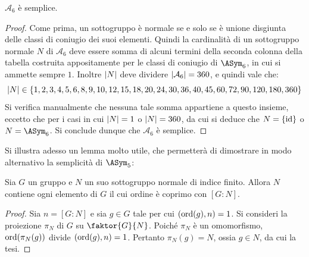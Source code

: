 \documentclass[11pt]{scrartcl}
\begin{document}
	\begin{proposition}
		\label{prop:a_6}
		$\mathcal{A}_6$ è semplice.
	\end{proposition}
	
	\begin{proof}
		Come prima, un sottogruppo è normale se e solo se è unione disgiunta
		delle classi di coniugio dei suoi elementi. Quindi la cardinalità
		di un sottogruppo normale $N$ di $\mathcal{A}_6$ deve essere somma di alcuni 
		termini della seconda colonna della tabella costruita appositamente
		per le classi di coniugio di $\ASym_6$,
		in cui si ammette sempre $1$. Inoltre $\left\lvert N \right\rvert$ deve dividere
		$\left\lvert \mathcal{A}_6 \right\rvert = 360$, e quindi vale che:
		\[ \left\lvert N \right\rvert \in \{1, 2, 3, 4, 5, 6, 8, 9, 10, 12, 15, 18, 20, 24, 30, 36, 40, 45, 60, 72, 90, 120, 180, 360\} \]
		Si verifica manualmente che nessuna tale somma appartiene a questo insieme,
		eccetto che per i casi in cui $\left\lvert N \right\rvert = 1$ o $\left\lvert N \right\rvert = 360$, da cui
		si deduce che $N = \{\mathrm{id}\}$ o $N = \ASym_6$.
		Si conclude dunque che $\mathcal{A}_6$ è semplice.
	\end{proof}
	
	Si illustra adesso un lemma molto utile, che permetterà di dimostrare in modo
	alternativo la semplicità di $\ASym_5$:
	
	\begin{lemma}
		\label{lemma1.62}
		Sia $G$ un gruppo e $N$ un suo sottogruppo normale di 
		indice finito. Allora $N$ contiene ogni elemento di $G$ il cui ordine è coprimo
		con $[G : N]$.
	\end{lemma}
	
	\begin{proof}
		Sia $n = [G : N]$ e
		sia $g \in G$ tale per cui $(\operatorname{ord}(g), n) = 1$. Si consideri la proiezione
		$\pi_N$ di $G$ su $\faktor{G}{N}$.
		Poiché $\pi_N$ è un omomorfismo, $\operatorname{ord}(\pi_N(g))$ divide $(\operatorname{ord}(g), n) = 1$.
		Pertanto $\pi_N(g) = N$, ossia $g \in N$, da cui la tesi.
	\end{proof}
	
\end{document}
